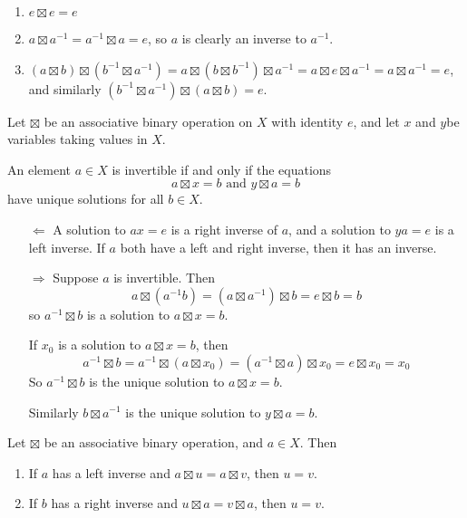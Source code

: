 \begin{pf}
\begin{enumerate}
\item $e\boxtimes e = e$
\item $a\boxtimes a^{-1}= a^{-1} {\boxtimes} a = e$, so $a$ is clearly an inverse to $a^{-1}$.
\item $(a\boxtimes b) \boxtimes (b^{-1}\boxtimes a^{-1}) = a\boxtimes (b\boxtimes b^{-1})\boxtimes a^{-1} = a\boxtimes e\boxtimes a^{-1}= a\boxtimes a^{-1}=e$, and similarly $(b^{-1}\boxtimes a^{-1})\boxtimes (a\boxtimes b)=e$.
\end{enumerate}
\end{pf}

\begin{prop}
Let $\boxtimes$ be an associative binary operation on $X$ with identity $e$, and let $x$ and $y$be variables taking values in $X$.

An element $a\in X$ is invertible if and only if the equations
$$
a\boxtimes x=b \text{ and } y\boxtimes a=b
$$
have unique solutions for all $b\in X$.
\end{prop}

\begin{pf}
\begin{itemize}
 \item[$\Leftarrow$] A solution to $ax=e$ is a right inverse of $a$, and a solution to $ya=e$ is a left inverse. If $a$ both have a left and right inverse, then it has an inverse.
\item[$\Rightarrow$] Suppose $a$ is invertible. Then
$$
a\boxtimes (a^{-1}b)=(a\boxtimes a^{-1})\boxtimes b = e\boxtimes b = b
$$
so $a^{-1}\boxtimes b$ is a solution to $a\boxtimes x=b$.

If $x_0$ is a solution to $a\boxtimes x=b$, then
$$
a^{-1}\boxtimes b=a^{-1}\boxtimes (a\boxtimes x_0) = (a^{-1}\boxtimes a)\boxtimes x_0=e\boxtimes x_0 = x_0
$$
So $a^{-1}\boxtimes b$ is the unique solution to $a\boxtimes x=b$.

Similarly $b\boxtimes a^{-1}$ is the unique solution to $y\boxtimes a=b$.
\end{itemize}
\end{pf}

\begin{prop}
Let $\boxtimes$ be an associative binary operation, and $a\in X$. Then
\begin{enumerate}
\item If $a$ has a left inverse and $a\boxtimes u = a \boxtimes v$, then $u=v$.
\item If $b$ has a right inverse and $u\boxtimes a = v\boxtimes a$, then $u=v$.
\end{enumerate}
\end{prop}


